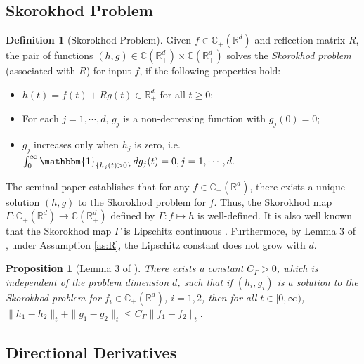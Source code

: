\documentclass[11pt]{article}
\theoremstyle{definition}
\newtheorem{definition}[assumption]{Definition}
\theoremstyle{plain}
\newtheorem{proposition}[assumption]{Proposition}
\newcommand{\C}{\mathbb{C}}
\begin{document}
\subsection{Skorokhod Problem}\label{ssec:skorokhod}

\begin{definition}[Skorokhod Problem]\label{def:skorokhod}
Given \( f \in \C_+(\mathbb{R}^d) \) and reflection matrix \( R \), the pair of functions \( (h,g) \in \C(\mathbb{R}_+^d)\times \C(\mathbb{R}_+^d) \) 
solves the {\em Skorokhod problem} (associated with \( R \)) for input \( f \), if the following properties hold:
\begin{itemize}
  \item[(i)] \( h(t) = f(t) + Rg(t) \in \mathbb{R}_+^d \) for all \( t \ge 0 \);
  \item[(ii)] For each \( j = 1, \cdots, d \), \( g_j \) is a non-decreasing function with \( g_j(0) = 0 \);
  \item[(iii)] \( g_j \) increases only when \( h_j \) is zero, i.e.
  \(
  \int_0^{\infty} \mathbbm{1}_{\{h_j(t) > 0\}}\, dg_j(t) = 0, j = 1, \cdots, d.
  \)
\end{itemize}
\end{definition}

The seminal paper \cite{HarrisonReiman1981} establishes that for any \( f \in \C_+(\mathbb{R}^d) \),  
there exists a unique solution \( (h, g) \) to the Skorokhod problem for \( f \). 
Thus, the Skorokhod map $\Gamma :  \C_+(\mathbb{R}^d) \to \C(\mathbb{R}_+^d) $ defined by 
\( \Gamma: f \mapsto h \) is well-defined.
It is also well known that the Skorokhod map \( \Gamma \) is Lipschitz continuous \cite{borkar2004ergodic,HarrisonReiman1981,REF,DupuisIshii1991,DupuisRamanan1999I,DupuisRamanan1999II}. 
Furthermore, by Lemma 3 of \cite{BlanchetChenSiGlynn2021}, under Assumption \ref{as:R}, the Lipschitz constant does not grow with $d$.

\begin{proposition}[Lemma 3 of \cite{BlanchetChenSiGlynn2021}]\label{prop:skorokhod-lipschitz}
There exists a constant \( C_\Gamma > 0 \), which is independent of the problem dimension $d$, 
such that if \( (h_i, g_i) \) is a solution to the Skorokhod problem for \( f_i \in \C_+(\mathbb{R}^d) \), \( i = 1,2 \), then for all \( t \in [0,\infty) \),
\(
\| h_1 - h_2 \|_t + \| g_1 - g_2 \|_t \le C_\Gamma \| f_1 - f_2 \|_t.
\)
\end{proposition}


\subsection{Directional Derivatives}\label{ssec:directional-derivatives}
\end{document}
